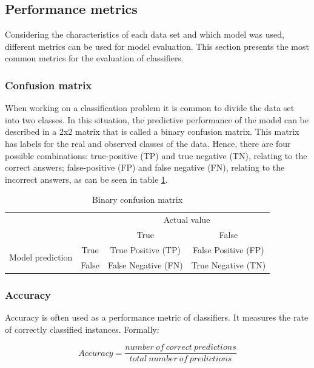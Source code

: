 \subsection{Performance metrics}
\label{sc:pm}

Considering the characteristics of each data set and which model was used, different metrics can be used for model evaluation. This section presents the most common metrics for the evaluation of classifiers.

\subsubsection{Confusion matrix}
When working on a classification problem it is common to divide the data set into two classes. In this situation, the predictive performance of the model can be described in a 2x2 matrix that is called a binary confusion matrix. This matrix has labels for the real and observed classes of the data. Hence, there are four possible combinations: true-positive (TP) and true negative (TN), relating to the correct answers; false-positive (FP) and false negative (FN), relating to the incorrect answers, as can be seen in table \ref{tab:cm}.

\begin{table}[htb]
\centering
\begin{tabular}{cccc}
\hline
\multirow{2}{*}{} & \multirow{2}{*}{} & \multicolumn{2}{c}{Actual value} \\ \cline{3-4} 
 &  & True & False \\ \hline
\multirow{2}{*}{Model prediction} & True & True Positive (TP) & False Positive (FP) \\ \cline{2-4} 
 & False & False Negative (FN) & True Negative (TN) \\ \hline
\end{tabular}
\caption{Binary confusion matrix}
\label{tab:cm}
\end{table}

\subsubsection{Accuracy}

Accuracy is often used as a performance metric of classifiers. It measures the rate of correctly classified instances. Formally:

\begin{equation} Accuracy = \frac{number\ of\ correct\ predictions}{total\ number\ of\ predictions} \end{equation}

